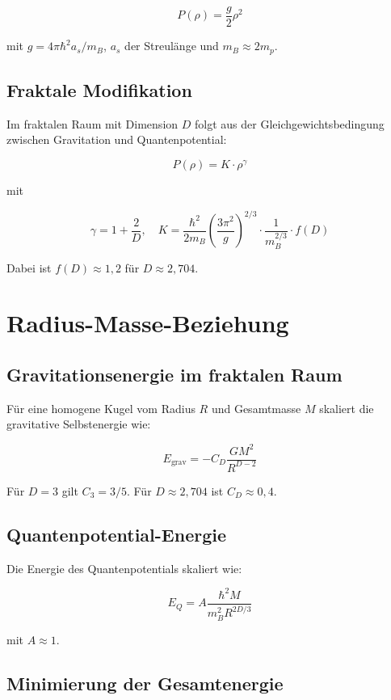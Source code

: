 \[
P(\rho) = \frac{g}{2} \rho^2 \tag{K.8}
\]

mit \( g = 4\pi\hbar^2 a_s / m_B \), \( a_s \) der Streulänge und \( m_B \approx 2m_p \).

\subsection{Fraktale Modifikation}
\label{sub:bec_fraktal}

Im fraktalen Raum mit Dimension \( D \) folgt aus der Gleichgewichtsbedingung zwischen Gravitation und Quantenpotential:

\[
P(\rho) = K \cdot \rho^{\gamma} \tag{K.9}
\]

mit

\[
\gamma = 1 + \frac{2}{D}, \quad 
K = \frac{\hbar^2}{2m_B} \left( \frac{3\pi^2}{g} \right)^{2/3} \cdot 
\frac{1}{m_B^{2/3}} \cdot f(D) \tag{K.10}
\]

Dabei ist \( f(D) \approx 1,2 \) für \( D \approx 2,704 \).

\section{Radius-Masse-Beziehung}
\label{app:bec_radius_masse}

\subsection{Gravitationsenergie im fraktalen Raum}
\label{sub:bec_grav_energie}

Für eine homogene Kugel vom Radius \( R \) und Gesamtmasse \( M \) skaliert die gravitative Selbstenergie wie:

\[
E_{\text{grav}} = -C_D \frac{GM^2}{R^{D-2}} \tag{K.11}
\]

Für \( D = 3 \) gilt \( C_3 = 3/5 \). Für \( D \approx 2,704 \) ist \( C_D \approx 0,4 \).

\subsection{Quantenpotential-Energie}
\label{sub:bec_q_energie}

Die Energie des Quantenpotentials skaliert wie:

\[
E_Q = A \frac{\hbar^2 M}{m_B^2 R^{2D/3}} \tag{K.12}
\]

mit \( A \approx 1 \).

\subsection{Minimierung der Gesamtenergie}
\label{sub:bec_minimierung}

